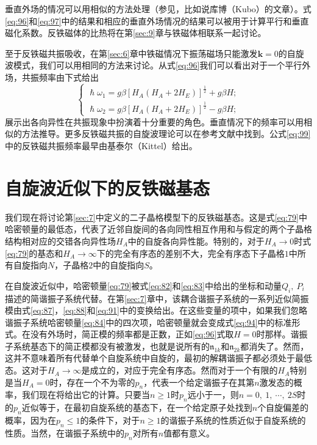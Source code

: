 \documentclass{article}
\begin{document}
垂直外场的情况可以用相似的方法处理（参见，比如说库博（Kubo）的文章）。式\eqref{eq:96}和\eqref{eq:97}中的结果和相应的垂直外场情况的结果可以被用于计算平行和垂直磁化系数。反铁磁体的比热将在第\ref{sec:9}章与铁磁体相联系一起讨论。

至于反铁磁共振吸收，在第\ref{sec:6}章中铁磁情况下振荡磁场只能激发$\mathbf{k}=0$的自旋波模式，我们可以用相同的方法来讨论。从式\eqref{eq:96}我们可以看出对于一个平行外场，共振频率由下式给出
\begin{equation} \label{eq:99}
\left\{
\begin{array}{l}
\hslash\omega_1=g\beta[H_A(H_A+2H_E)]^\frac{1}{2}+g\beta H;\\
\hslash\omega_2=g\beta[H_A(H_A+2H_E)]^\frac{1}{2}-g\beta H;
\end{array}
\right.
\end{equation}
展示出各向异性在共振现象中扮演着十分重要的角色。垂直情况下的频率可以用相似的方法推导。更多反铁磁共振的自旋波理论可以在参考文献中找到。公式\eqref{eq:99}中的反铁磁共振频率最早由基泰尔（Kittel）给出。




\section{自旋波近似下的反铁磁基态} \label{sec:8}

我们现在将讨论第\ref{sec:7}中定义的二子晶格模型下的反铁磁基态。这是式\eqref{eq:79}中哈密顿量的最低态，代表了近邻自旋间的各向同性相互作用和与假定的两个子晶格结构相对应的交错各向异性场$H_A$中的自旋各向异性能。特别的，对于$H_A\rightarrow 0$时式\eqref{eq:79}的基态和$H_A\rightarrow\infty$下的完全有序态的差别不大，完全有序态下子晶格$1$中所有自旋指向$N$，子晶格$2$中的自旋指向$S$。

在自旋波近似中，哈密顿量\eqref{eq:79}被式\eqref{eq:82}和\eqref{eq:83}中给出的坐标和动量$Q_i,~P_i$描述的简谐振子系统代替。在第\ref{sec:7}章中，该耦合谐振子系统的一系列近似简振模由式\eqref{eq:87}，\eqref{eq:88}和\eqref{eq:91}中的变换给出。在这些变量的项中，如果我们忽略谐振子系统哈密顿量\eqref{eq:84}中的四次项，哈密顿量就会变成式\eqref{eq:94}中的标准形式。在没有外场时，简正模的频率都是正数，正如\eqref{eq:96}式取$H=0$时那样。谐振子系统基态下的简正模都没有被激发，也就是说所有的$\mathfrak{n}_{1k}$和$\mathfrak{n}_{2k}$都消失了。然而，这并不意味着所有代替单个自旋系统中自旋的，最初的解耦谐振子都必须处于最低态。这对于$H_A\rightarrow\infty$是成立的，对应于完全有序态。然而对于一个有限的$H_A$特别是当$H_A=0$时，存在一个不为零的$p_n$，代表一个给定谐振子在其第$n$激发态的概率，我们现在将给出它的计算。只要当$n\geqslant 1$时$p_n$远小于一，则$n=0,~1,~\cdots,~2S$时的$p_n$近似等于，在最初自旋系统的基态下，在一个给定原子处找到$n$个自旋偏差的概率，因为在$p_n\leqslant 1$的条件下，对于$n\geqslant 1$的谐振子系统的性质近似于自旋系统的性质。当然，在谐振子系统中的$p_n$对所有$n$值都有意义。
\end{document}
